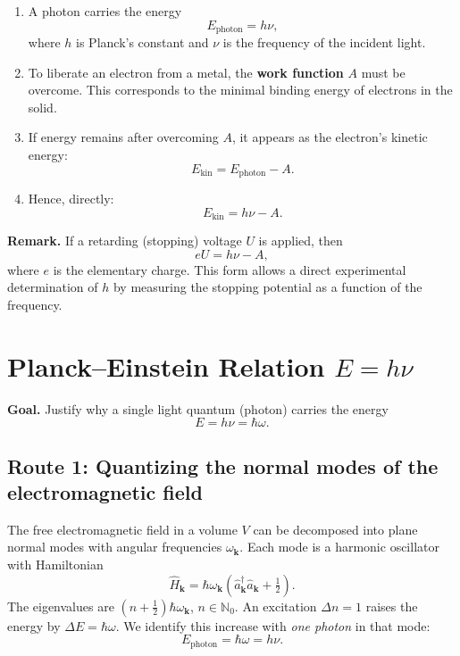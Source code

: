 \begin{enumerate}
	\item A photon carries the energy
	\[
	E_{\text{photon}} = h \nu,
	\]
	where \( h \) is Planck’s constant and \( \nu \) is the frequency of the incident light.
	
	\item To liberate an electron from a metal, the \textbf{work function} \( A \) must be overcome. This corresponds to the minimal binding energy of electrons in the solid.
	
	\item If energy remains after overcoming \( A \), it appears as the electron’s kinetic energy:
	\[
	E_{\text{kin}} = E_{\text{photon}} - A.
	\]
	
	\item Hence, directly:
	\[
	E_{\text{kin}} = h \nu - A.
	\]
\end{enumerate}

\textbf{Remark.}  
If a retarding (stopping) voltage \( U \) is applied, then
\[
eU = h \nu - A,
\]
where \( e \) is the elementary charge. This form allows a direct experimental determination of \( h \) by measuring the stopping potential as a function of the frequency.

\section{Planck–Einstein Relation \texorpdfstring{$E = h\nu$}{E = hν}}
\label{anhangA:planckEinstein}

\textbf{Goal.} Justify why a single light quantum (photon) carries the energy
\[
E = h\nu = \hbar \omega .
\]

\subsection*{Route 1: Quantizing the normal modes of the electromagnetic field}
The free electromagnetic field in a volume \(V\) can be decomposed into plane normal modes with angular frequencies \(\omega_{\mathbf{k}}\). Each mode is a harmonic oscillator with Hamiltonian
\[
\hat H_{\mathbf{k}}=\hbar \omega_{\mathbf{k}}\!\left(\hat a_{\mathbf{k}}^\dagger \hat a_{\mathbf{k}}+\tfrac12\right).
\]
The eigenvalues are \((n+\tfrac12)\hbar\omega_{\mathbf{k}}\), \(n\in \mathbb{N}_0\). 
An excitation \(\Delta n = 1\) raises the energy by \(\Delta E = \hbar \omega\). 
We identify this increase with \emph{one photon} in that mode:
\[
E_{\text{photon}}=\hbar\omega=h\nu.
\]

